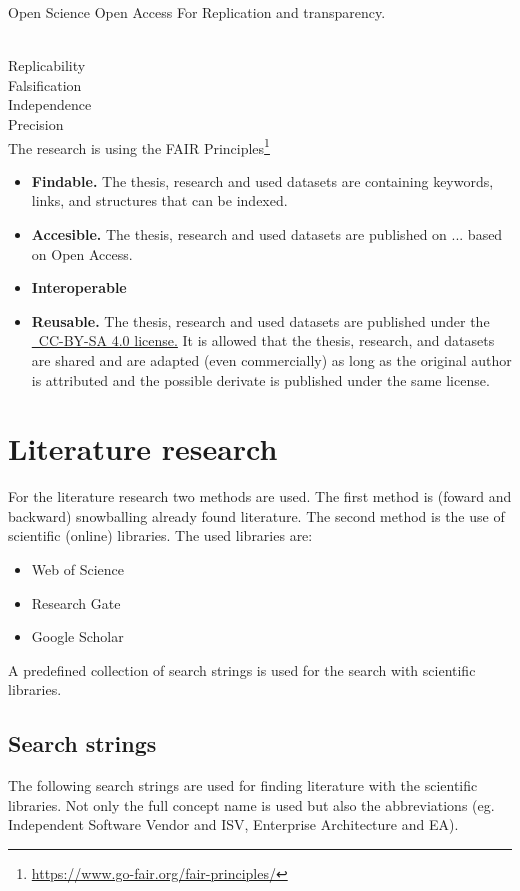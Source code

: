 Open Science
Open Access
For Replication and transparency.


\parencite[p. 16]{Recker2013}\\
Replicability\\
Falsification\\
Independence\\
Precision\\

The research is using the FAIR Principles\footnote{\url{https://www.go-fair.org/fair-principles/}}\\
\begin{itemize}
	\item{\textbf{Findable.} The thesis, research and used datasets are containing keywords, links, and structures that can be indexed.}
	\item{\textbf{Accesible.} The thesis, research and used datasets are published on ... based on Open Access.}
	\item{\textbf{Interoperable}}
	\item{\textbf{Reusable.} The thesis, research and used datasets are published under the  \href{https://creativecommons.org/licenses/by-sa/4.0/}{\ccbysa\ CC-BY-SA 4.0 license.} It is allowed that the thesis, research, and datasets are shared and are adapted (even commercially) as long as the original author is attributed and the possible derivate is published under the same license.}
\end{itemize}

\section{Literature research}
For the literature research two methods are used. The first method is (foward and backward) snowballing already found literature. The second method is the use of scientific (online) libraries. The used libraries are:
\begin{itemize}
	\item{Web of Science}
	\item{Research Gate}
	\item{Google Scholar}
\end{itemize}

\noindent A predefined collection of search strings is used for the search with scientific libraries.

\subsection{Search strings}
The following search strings are used for finding literature with the scientific libraries. Not only the full concept name is used but also the abbreviations (eg. Independent Software Vendor and ISV, Enterprise Architecture and EA).\\

